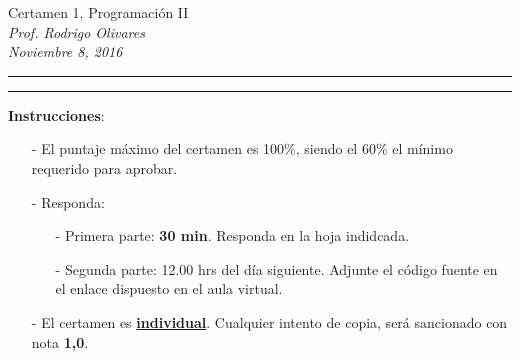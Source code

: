 \documentclass[10pt]{article}
\begin{document}
\begin{center}
    {\Large Certamen 1, Programaci\'on II} \\
    \emph{\small Prof. Rodrigo Olivares} \\
    \emph{\scriptsize Noviembre 8, 2016}
\end{center}
\vspace*{-35pt}
\begin{center}
    \rule{1\textwidth}{.3pt}
\end{center}
\vspace*{-42pt}
\begin{center}
    \rule{1\textwidth}{2pt}
\end{center}

\vspace*{-15pt}
{\small \textbf{Instrucciones}:}
\vspace*{-15pt}

{\scriptsize
\begin{itemize}
    \item[-] El puntaje m\'aximo del certamen es 100\%, siendo el 60\% el m\'inimo requerido para aprobar.
    \item[-] Responda:
        \begin{itemize}
            \item[-] Primera parte: \textbf{30 min}. Responda en la hoja indidcada.
            \item[-] Segunda parte: 12.00 hrs del d\'ia siguiente. Adjunte el c\'odigo fuente en el enlace dispuesto en el aula virtual. 
        \end{itemize}
    \item[-] El certamen es \underline{\textbf{individual}}. Cualquier intento de copia, ser\'a sancionado con nota \textbf{1,0}.
\end{itemize}
}
\vspace*{10pt}

\vspace*{-30pt}
\end{document}
